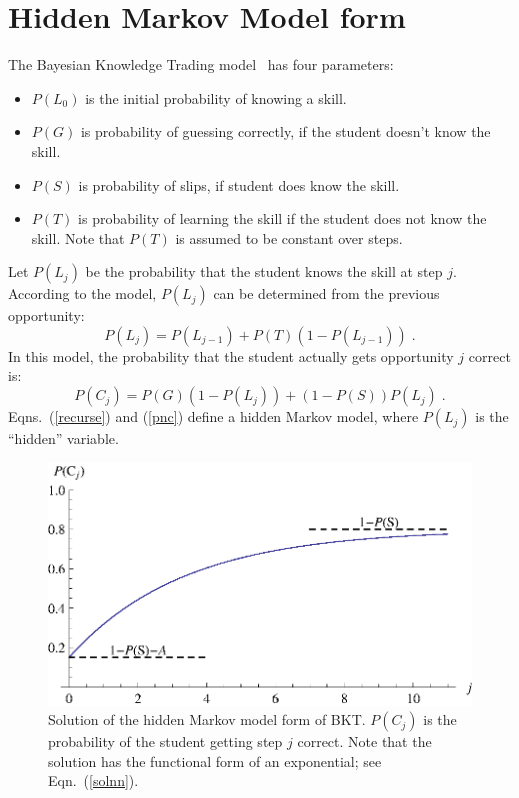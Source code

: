 \documentclass{acmlarge-edm}
\begin{document}
\section{Hidden Markov Model form}

The Bayesian Knowledge Trading model~\cite{corbett_knowledge_1995} 
has four parameters:
%
\begin{itemize}
   \item $P(L_0)$ is the initial probability of knowing a skill.
   \item $P(G)$ is probability of guessing correctly, if the student        
         doesn't know the skill.
   \item $P(S)$ is probability of slips, if student does know the skill.
   \item $P(T)$ is probability of learning the skill if the student 
         does not know the skill.  Note that $P(T)$ is assumed to 
         be constant over steps.
\end{itemize}
%
Let $P(L_j)$ be the probability that the student knows the skill at 
step $j$. According to the model,  $P(L_j)$ can
be determined from the previous opportunity:
%
\begin{equation}
          P(L_j) = P(L_{j-1}) + P(T)\left(1-P(L_{j-1})\right)  \; . 
        \label{recurse}
\end{equation}
%
In this model, the probability that the student actually gets
opportunity $j$ correct is:
%
\begin{equation}
        P(C_j) = P(G)\left(1-P(L_j)\right) + \left(1-P(S)\right) P(L_j) \; . 
         \label{pnc}
\end{equation}
%
Eqns.~(\ref{recurse}) and (\ref{pnc}) define a hidden Markov model, 
where $P(L_j)$ is the ``hidden'' variable.

\begin{figure}
\centering\includegraphics{exponential.eps}
\caption{Solution of the hidden Markov model form of BKT.
          $P(C_j)$ is the probability of  the student getting step $j$
          correct.  Note that the solution has the functional form of
          an exponential; see Eqn.~(\ref{solnn}).}
\label{bktgraph}
\end{figure}
\end{document}
